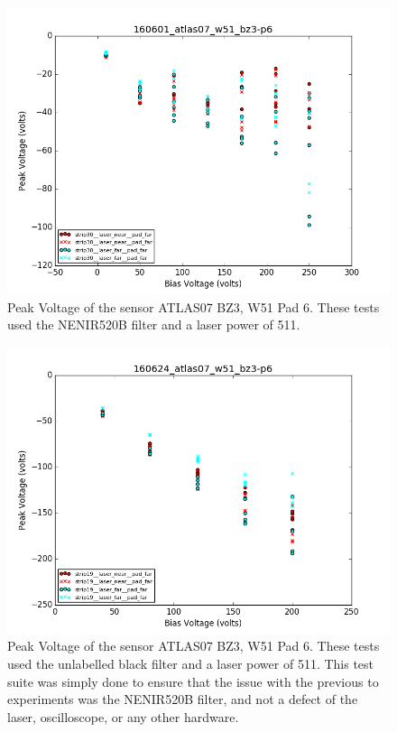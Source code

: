 \documentclass{report}
\begin{document}
            \begin{figure}[h] 
                \includegraphics[height=.4\textheight]{160601_atlas07_w51_bz3-p6}
                \centering
                \caption{ Peak Voltage of the sensor ATLAS07 BZ3, W51 Pad 6. These tests used the NENIR520B filter and a laser power of 511. }
                \label{fig:160601_atlas07_w51_bz3-p6}
            \end{figure}

            \begin{figure}[h] 
                \includegraphics[height=.4\textheight]{160624_atlas07_w51_bz3-p6}
                \centering
                \caption{ Peak Voltage of the sensor ATLAS07 BZ3, W51 Pad 6. These tests used the unlabelled black filter and a laser power of 511. This test suite was simply done to ensure that the issue with the previous to experiments was the NENIR520B filter, and not a defect of the laser, oscilloscope, or any other hardware. }
                \label{fig:160624_atlas07_w51_bz3-p6}
            \end{figure}
\end{document}
